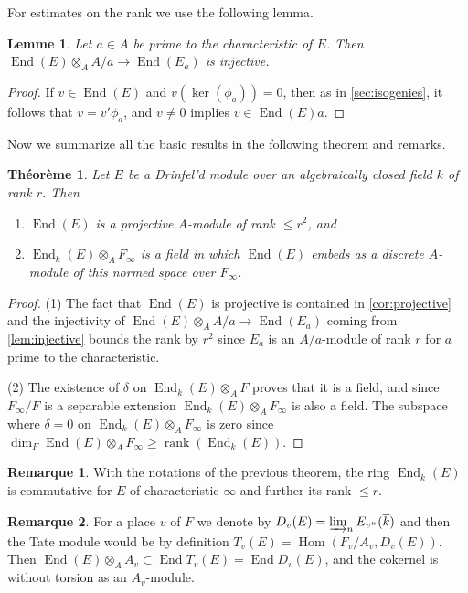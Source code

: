 \documentclass[12pt,a4paper]{article}
\theoremstyle{plain}
\newtheorem{theorem}{Th\'eor\`eme}[section]
\newtheorem{lemma}{Lemme}[section]
\theoremstyle{definition}
\newtheorem{remark}{Remarque}[section]
\theoremstyle{remark}
\DeclareMathOperator{\End}{End}
\DeclareMathOperator{\Hom}{Hom}
\providecommand{\Hom}{\operatorname{Hom}}
\providecommand{\End}{\operatorname{End}}
\providecommand{\rank}{\operatorname{rank}}
\begin{document}
For estimates on the rank we use the following lemma.

\begin{lemma}
\label{lem:injective}
Let $a \in A$ be prime to the characteristic of $E$. Then $\End(E) \otimes_A A/a \to \End(E_a)$ is injective.
\end{lemma}

\begin{proof}
If $v \in \End(E)$ and $v(\ker(\phi_a)) = 0$, then as in \eqref{sec:isogenies}, it follows that $v = v' \phi_a$, and $v \neq 0$ implies $v \in \End(E)a$.
\end{proof}

Now we summarize all the basic results in the following theorem and remarks.

\begin{theorem}
\label{thm:end}
Let $E$ be a Drinfel'd module over an algebraically closed field $k$ of rank $r$. Then
\begin{enumerate}[label=(\arabic*)]
\item $\End(E)$ is a projective $A$-module of rank $\leq r^2$, and
\item $\End_k(E) \otimes_A F_\infty$ is a field in which $\End(E)$ embeds as a discrete $A$-module of this normed space over $F_\infty$.
\end{enumerate}
\end{theorem}

\begin{proof}
(1) The fact that $\End(E)$ is projective is contained in \eqref{cor:projective} and the injectivity of $\End(E) \otimes_A A/a \to \End(E_a)$ coming from \eqref{lem:injective} bounds the rank by $r^2$ since $E_a$ is an $A/a$-module of rank $r$ for $a$ prime to the characteristic.

(2) The existence of $\delta$ on $\End_k(E) \otimes_A F$ proves that it is a field, and since $F_\infty/F$ is a separable extension $\End_k(E) \otimes_A F_\infty$ is also a field. The subspace where $\delta = 0$ on $\End_k(E) \otimes_A F_\infty$ is zero since $\dim_F \End(E) \otimes_A F_\infty \geq \rank(\End_k(E))$.
\end{proof}

\begin{remark}
\label{rem:commutative}
With the notations of the previous theorem, the ring $\End_k(E)$ is commutative for $E$ of characteristic $\infty$ and further its rank $\leq r$.
\end{remark}

\begin{remark}
\label{rem:tatemod}
For a place $v$ of $F$ we denote by $D_v(E) = \varinjlim_n E_{v^n}(\overline{k})$ and then the Tate module would be by definition $T_v(E) = \Hom(F_v/A_v, D_v(E))$. Then $\End(E) \otimes_A A_v \subset \End T_v(E) = \End D_v(E)$, and the cokernel is without torsion as an $A_v$-module.
\end{remark}
\end{document}
